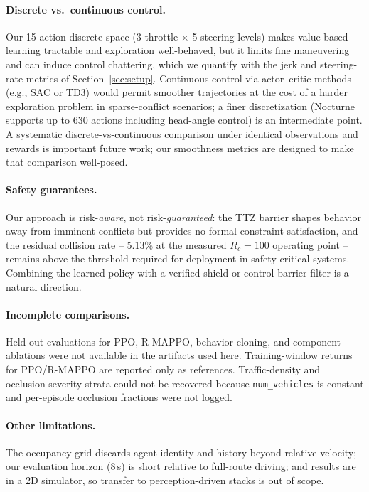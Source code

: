 \documentclass{article}
\begin{document}
\paragraph{Discrete vs.\ continuous control.}
Our 15-action discrete space (3 throttle $\times$ 5 steering levels) makes
value-based learning tractable and exploration well-behaved, but it limits
fine maneuvering and can induce control chattering, which we quantify with
the jerk and steering-rate metrics of Section~\ref{sec:setup}. Continuous
control via actor--critic methods (e.g., SAC or TD3) would permit smoother
trajectories at the cost of a harder exploration problem in
sparse-conflict scenarios; a finer discretization (Nocturne supports up to
630 actions including head-angle control) is an intermediate point. A
systematic discrete-vs-continuous comparison under identical observations
and rewards is important future work; our smoothness metrics are designed
to make that comparison well-posed.

\paragraph{Safety guarantees.}
Our approach is risk-\emph{aware}, not risk-\emph{guaranteed}: the TTZ
barrier shapes behavior away from imminent conflicts but provides no formal
constraint satisfaction, and the residual collision rate -- 5.13\% at the
measured $R_c{=}100$ operating point -- remains above the threshold required
for deployment in safety-critical systems. Combining the learned policy with
a verified shield or control-barrier filter is a natural direction.

\paragraph{Incomplete comparisons.}
Held-out evaluations for PPO, R-MAPPO, behavior cloning, and component
ablations were not available in the artifacts used here. Training-window
returns for PPO/R-MAPPO are reported only as references. Traffic-density and
occlusion-severity strata could not be recovered because
\texttt{num\_vehicles} is constant and per-episode occlusion fractions were
not logged.

\paragraph{Other limitations.}
The occupancy grid discards agent identity and history beyond relative
velocity; our evaluation horizon (8\,s) is short relative to full-route
driving; and results are in a 2D simulator, so transfer to
perception-driven stacks is out of scope.
\end{document}

